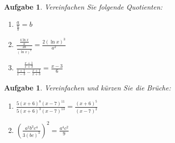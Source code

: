 \documentclass[12pt]{article}
\newtheorem{exercise}[satz]{Aufgabe}
\begin{document}
    \vspace{0.2cm}

   \begin{exercise}
  Vereinfachen Sie folgende Quotienten:
  \begin{multicols}{2}
  \begin{enumerate}
  \item[(a)] $\frac{a}{\frac{a}{b}} = b$
  \item[(b)] $\frac{\frac{4 \ln{x}}{a}}{\frac{2a}{(\ln{x})^2}} = \frac{2(\ln{x})^3}{a^2}$
  \item[(c)] $\frac{\frac{x+1}{x+3}}{\frac{x+1}{x-3}-\frac{x+1}{x+3}} = \frac{x-3}{6}$
  \end{enumerate}
  \end{multicols}
   \end{exercise}

    \vspace{0.2cm}

    \begin{exercise}
  Vereinfachen und k\"urzen Sie die Br\"uche:
  \begin{enumerate}
  \item[(a)] $\frac{5(x+6)^8 (x-7)^{11}}{5(x+6)^3 (x-7)^{13}} = \frac{(x+6)^5}{(x-7)^2}$
  \item[(b)] $(\frac{a^2b^3c^4}{3(bc)^3})^2 = \frac{a^4c^2}{9}$
  \end{enumerate}
   \end{exercise}
   
 
\end{document}
